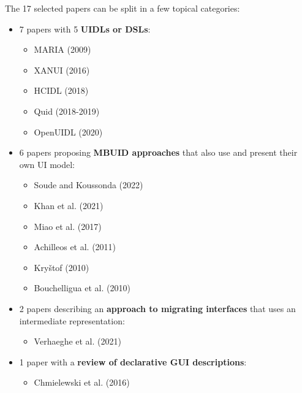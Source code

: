 The 17 selected papers can be split in a few topical categories:
\begin{itemize}
    \item 7 papers with 5 \textbf{UIDLs or DSLs}:
    \begin{itemize}
              \item MARIA (2009)~\cite{Paterno2009, MariaPDF}
              \item XANUI (2016)~\cite{hermida2016xanui}
              \item HCIDL (2018)~\cite{Gaouar2018}
              \item Quid (2018-2019)~\cite{molina2018quid, Molina2019}
              \item OpenUIDL (2020)~\cite{Moldovan2020}
    \end{itemize}
    \item 6 papers proposing \textbf{MBUID approaches} that also use and present their own UI model:
    \begin{itemize}
        \item Soude and Koussonda (2022)~\cite{Soude2022}
        \item Khan et al. (2021)~\cite{Khan2021}
        \item Miao et al. (2017)~\cite{Miao2017}
        \item Achilleos et al. (2011)~\cite{Achilleos2011}
        \item Kry{\v{s}}tof (2010)~\cite{kryvstof2010lpgm}
        \item Bouchelligua et al. (2010)~\cite{Bouchelligua2010}
    \end{itemize}
    \item 2 papers describing an \textbf{approach to migrating interfaces} that uses an intermediate representation:
    \begin{itemize}
        \item Verhaeghe et al. (2021)~\cite{Verhaeghe2021visual, Verhaeghe2021behavior}
    \end{itemize}
    \item 1 paper with a \textbf{review of declarative GUI descriptions}:
    \begin{itemize}
        \item Chmielewski et al. (2016)~\cite{Chmielewski2016}
    \end{itemize}
\end{itemize}

